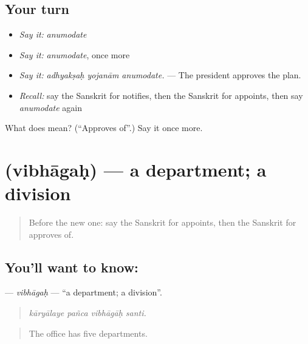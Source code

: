 \subsection*{Your turn}
\begin{itemize}
\raggedright
  \item \emph{Say it:} \emph{anumodate}
  \item \emph{Say it:} \emph{anumodate}, once more
  \item \emph{Say it:} \emph{adhyakṣaḥ yojanām anumodate.} — The president approves the plan.
  \item \emph{Recall:} say the Sanskrit for notifies, then the Sanskrit for appoints, then say \emph{anumodate} again
\end{itemize}

\begin{tcolorbox}[breakable,colback=teal!4,colframe=teal!35!black,title={Before you move on}]
What does  mean? (\textquotedblleft{}Approves of\textquotedblright{}.) Say it once more.
\end{tcolorbox}
\section[\texorpdfstring{\sk{विभागः} (vibhāgaḥ)}{विभागः (vibhāgaḥ)}]{ (vibhāgaḥ) — a department; a division}

\label{lesson:SA-C356-vibhagah}



\begin{quote}
Before the new one: say the Sanskrit for appoints, then the Sanskrit for approves of.
\end{quote}

\subsection*{You'll want to know: }
\textbf{} — \emph{vibhāgaḥ} — \textquotedblleft{}a department; a division\textquotedblright{}.

\begin{quote}
   
\end{quote}

\begin{quote}
\emph{kāryālaye pañca vibhāgāḥ santi.}
\end{quote}

\begin{quote}
The office has five departments.
\end{quote}

